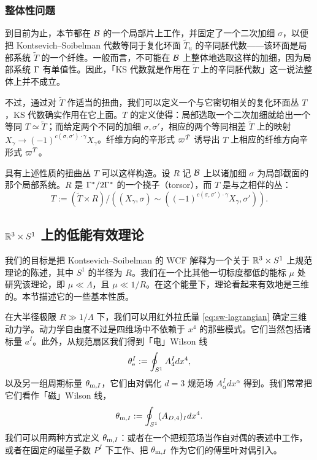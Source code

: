 \subsubsection*{整体性问题}

到目前为止，本节都在 $\mathcal{B}$ 的一个局部片上工作，并固定了一个二次加细 $\sigma$，以便把 Kontsevich--Soibelman 代数等同于复化环面 $\tilde{T}_u$ 的辛同胚代数——该环面是局部系统 $\tilde{T}$ 的一个纤维。一般而言，不可能在 $\mathcal{B}$ 上整体地选取这样的加细，因为局部系统 $\Gamma$ 有单值性。因此，「KS 代数就是作用在 $\tilde{T}$ 上的辛同胚代数」这一说法整体上并不成立。

不过，通过对 $\tilde{T}$ 作适当的扭曲，我们可以定义一个与它密切相关的复化环面丛 $T$，KS 代数确实作用在它上面。$T$ 的定义使得：局部选取一个二次加细就给出一个等同 $T \simeq \tilde{T}$；而给定两个不同的加细 $\sigma, \sigma'$，相应的两个等同相差 $\tilde{T}$ 上的映射 $X_\gamma \to (-1)^{c(\sigma, \sigma') \cdot \gamma} X_\gamma$。纤维方向的辛形式 $\varpi^{\tilde T}$ 诱导出 $T$ 上相应的纤维方向辛形式 $\varpi^T$。

具有上述性质的扭曲丛 $T$ 可以这样构造。设 $R$ 记 $\mathcal{B}$ 上以诸加细 $\sigma$ 为局部截面的那个局部系统。$R$ 是 $\Gamma^*/2\Gamma^*$ 的一个挠子（torsor），而 $T$ 是与之相伴的丛：
\begin{equation}
T := \left( \tilde{T} \times R \right) / \left( (X_\gamma, \sigma) \sim
((-1)^{c(\sigma, \sigma') \cdot \gamma} X_\gamma, \sigma') \right).
\end{equation}

\subsection{$\mathbb{R}^3 \times S^1$ 上的低能有效理论}
\label{sec:reduction}

我们的目标是把 Kontsevich--Soibelman 的 WCF 解释为一个关于 $\mathbb{R}^3 \times S^1$ 上规范理论的陈述，其中 $S^1$ 的半径为 $R$。我们在一个比其他一切标度都低的能标 $\mu$ 处研究该理论，即 $\mu \ll \Lambda$，且 $\mu \ll 1/R$。在这个能量下，理论看起来有效地是三维的。本节描述它的一些基本性质。

在大半径极限 $R \gg 1/\Lambda$ 下，我们可以用红外拉氏量 \eqref{eq:sw-lagrangian} 确定三维动力学。动力学自由度不过是四维场中不依赖于 $x^4$ 的那些模式。它们当然包括诸标量 $a^I$。此外，从规范扇区我们得到「电」Wilson 线
\begin{equation}
\theta_{\mathrm{e}}^I := \oint_{S^1} A_4^I dx^4,
\end{equation}
以及另一组周期标量 $\theta_{\mathrm{m},I}$，它们由对偶化 $d=3$ 规范场 $A^I_\alpha dx^\alpha$ 得到。我们常常把它们看作「磁」Wilson 线，
\begin{equation}
\theta_{\mathrm{m},I} := \oint_{S^1} (A_{D,4})_I dx^4.
\end{equation}
我们可以用两种方式定义 $\theta_{\mathrm{m},I}$：或者在一个把规范场当作自对偶的表述中工作，或者在固定的磁量子数 $P^I$ 下工作、把 $\theta_{\mathrm{m},I}$ 作为它们的傅里叶对偶引入。

